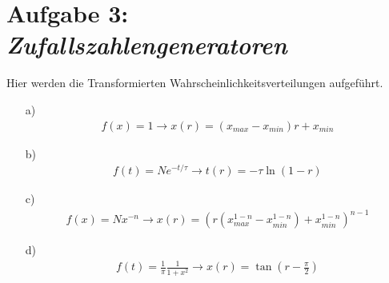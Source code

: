 \section*{Aufgabe 3: \emph{Zufallszahlengeneratoren}}
Hier werden die Transformierten Wahrscheinlichkeitsverteilungen aufgeführt.
\begin{itemize}
\item[a)]
\begin{align*}
f(x) = 1
\rightarrow x(r) =  (x_{max} - x_{min}) r + x_{min}
\end{align*}
\item[b)] 
\begin{align*}
f(t) = N e^{-t/\tau}
\rightarrow t(r) = -\tau \ln(1-r)
\end{align*}
\item[c)] 
\begin{align*}
f(x) = N x^{-n}
\rightarrow x(r) = ( r  (x_{max}^{1-n} - x_{min}^{1-n}) +x_{min}^{1-n})^{n-1}
\end{align*}
\item[d)]
\begin{align*}
f(t) = \frac{1}{\pi} \frac{1}{1+x^2}
\rightarrow x(r) = \tan\left(r-\frac{\pi}{2}\right)
\end{align*}
\end{itemize}

